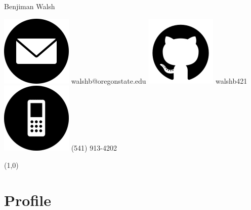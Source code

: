 \documentclass[12pt,letterpaper]{article}
\begin{document}
	\centering
	{\huge
		Benjiman Walsh
	}

	\vspace{0.5cm}

	\includegraphics[scale=0.15]{./images/email_icon}
	walshb@oregonstate.edu
	\hspace{1cm}
	\includegraphics[scale=0.15]{./images/github_icon}
	walshb421 
	\hspace{1cm}
	\includegraphics[scale=0.15]{./images/phone_icon}
	(541) 913-4202

	\noindent
	\line(1,0){\textwidth}
	
	
	\raggedright

	\section*{Profile}
\end{document}
